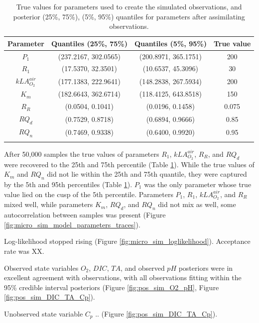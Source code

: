 \documentclass{ruthesis}
\begin{document}
\begin{longtable}{|c|c|c|c|} 
		\hline
		\bfseries{Parameter}  & \bfseries{Quantiles (25\%, 75\%)}  & \bfseries{Quantiles (5\%, 95\%)} &  \bfseries{True value} \\ \hline
		$P_1$ 				& (237.2167, 302.0565) 	& (200.8971, 365.1751) 	&  200  \\ 
		$R_1$ 				& (17.5370, 32.3501) 	& (10.6537, 45.3096)	& 	30 \\ 
		$kLA_{O_2}^{air}$ 	& (177.1383, 222.9641)  & (148.2838, 267.5934)  &  200 \\
		$K_m$ 				& (182.6643, 362.6714) 	& (118.4125, 643.8518) 	&  150 \\ 
		$R_R$ 				& (0.0504, 0.1041) 		& (0.0196, 0.1458) 		& 0.075 \\
		$RQ_d$ 				& (0.7529, 0.8718) 		& (0.6894, 0.9666) 		& 0.85 \\	
		$RQ_n$ 				& (0.7469, 0.9338) 		& (0.6400, 0.9920) 		& 0.95 \\	
		\hline
		\caption[.]{True values for parameters used to create the simulated observations, and posterior (25\%, 75\%), (5\%, 95\%) quantiles for parameters after assimilating observations.}	
		\label{table:micro_parameters_sim}
\end{longtable}

After 50,000 samples the true values of parameters $R_1$, $kLA_{O_2}^{air}$, $R_R$, and $RQ_d$ were recovered to the 25th and 75th percentile (Table \ref{table:micro_parameters_sim}). While the true values of $K_m$ and $RQ_n$ did not lie within the 25th and 75th quantile, they were captured by the 5th and 95th percentiles (Table \ref{table:micro_parameters_sim}). $P_1$ was the only parameter whose true value lied on the cusp of the 5th percentile. Parameters $P_1$, $R_1$, $kLA_{O_2}^{air}$, and $R_R$ mixed well, while parameters $K_m$, $RQ_d$, and $RQ_n$ did not mix as well, some autocorrelation between samples was present (Figure \ref{fig:micro_sim_model_parameters_traces}).

Log-likelihood stopped rising (Figure \ref{fig:micro_sim_loglikelihood}).
Acceptance rate was XX.


Observed state variables $O_2$, $DIC$, $TA$, and observed $pH$ posteriors were in excellent agreement with observations, with all observations fitting within the 95\% credible interval posteriors (Figure \ref{fig:pos_sim_O2_pH}, Figure \ref{fig:pos_sim_DIC_TA_Cp}).

Unobserved state variable $C_p$ .. (Figure \ref{fig:pos_sim_DIC_TA_Cp}).
\end{document}
